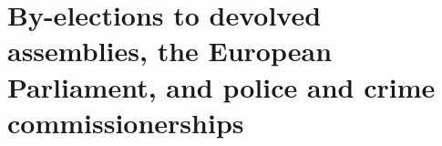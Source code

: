 \documentclass[a4paper,openany]{book}
\begin{document}
%
%
%
%
%

\chapter{By-elections to devolved assemblies, the European Parliament, and police and crime commissionerships}
\end{document}
